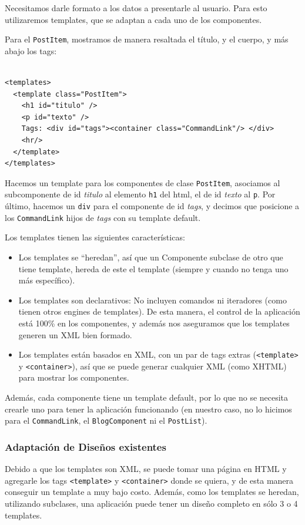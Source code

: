 Necesitamos darle formato a los datos a presentarle al usuario. Para esto utilizaremos templates, que se adaptan a cada uno de los componentes.

Para el \verb'PostItem', mostramos de manera resaltada el título, y el cuerpo, y más abajo los tags:

\begin{verbatim}

<templates>
  <template class="PostItem">
    <h1 id="titulo" />
    <p id="texto" />
    Tags: <div id="tags"><container class="CommandLink"/> </div>
    <hr/>
  </template>
</templates>

\end{verbatim}

Hacemos un template para los componentes de clase \verb'PostItem', asociamos al subcomponente de id \emph{titulo} al elemento \verb'h1' del html, el de id \emph{texto} al \verb'p'. Por último, hacemos un \verb'div' para el componente de id \emph{tags}, y decimos que posicione a los \verb'CommandLink' hijos de \emph{tags} con su template default.

Los templates tienen las siguientes características:
\begin{itemize}
\item Los templates se ``heredan'', así que un Componente subclase de otro que tiene template, hereda de este el template (siempre y cuando no tenga uno más específico).

\item Los templates son declarativos: No incluyen comandos ni iteradores (como tienen otros engines de templates). De esta manera, el control de la aplicación está 100\% en los componentes, y además nos aseguramos que los templates generen un XML bien formado.

\item Los templates están basados en XML, con un par de tags extras (\verb"<template>" y \verb"<container>"), así que se puede generar cualquier XML (como XHTML) para mostrar los componentes.
\end{itemize}

Además, cada componente tiene un template default, por lo que no se necesita crearle uno para tener la aplicación funcionando (en nuestro caso, no lo hicimos para el \verb'CommandLink', el \verb"BlogComponent" ni el \verb"PostList").

\subsubsection{Adaptación de Diseños existentes}
\label{sub-templates-adapt}
Debido a que los templates son XML, se puede tomar una página en HTML y agregarle los tags \verb"<template>" y \verb"<container>" donde se quiera, y de esta manera conseguir un template a muy bajo costo. Además, como los templates se heredan, utilizando
subclases, una aplicación puede tener un diseño completo en sólo 3 o 4 templates.

